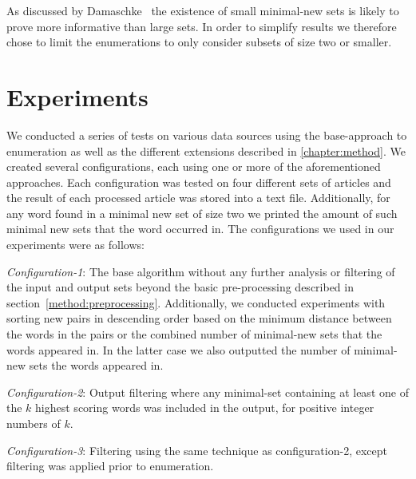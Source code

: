 As discussed by Damaschke~\cite{damaschke2015pairs} the existence of small minimal-new sets is likely to prove more informative than large sets. In order to simplify results we therefore chose to limit the enumerations to only consider subsets of size two or smaller.

\section{Experiments}
We conducted a series of tests on various data sources using the base-approach to enumeration as well as the different extensions described in \cref{chapter:method}. We created several configurations, each using one or more of the aforementioned approaches. Each configuration was tested on four different sets of articles and the result of each processed article was stored into a text file. Additionally, for any word found in a minimal new set of size two we printed the amount of such minimal new sets that the word occurred in. The configurations we used in our experiments were as follows:


\emph{Configuration-1}: The base algorithm without any further analysis or filtering of the input and output sets beyond the basic pre-processing described in section~\ref{method:preprocessing}. Additionally, we conducted experiments with sorting new pairs in descending order based on the minimum distance between the words in the pairs or the combined number of minimal-new sets that the words appeared in. In the latter case we also outputted the number of minimal-new sets the words appeared in.


\emph{Configuration-2}: Output filtering where any minimal-set containing at least one of the $k$ highest scoring words was included in the output, for positive integer numbers of $k$. 


\emph{Configuration-3}: Filtering using the same technique as configuration-2, except filtering was applied prior to enumeration.

